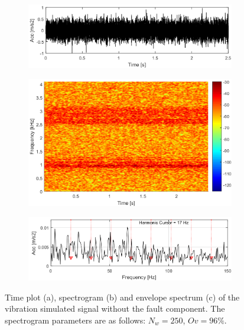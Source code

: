 \begin{figure}[!ht]
    \centering
    \begin{subfigure}[b]{0.8\textwidth}
        \centering
        \captionsetup{skip=0.01pt}
         \caption{}
        \includegraphics[width=\textwidth]{wykresy/chapter_application/semi_blind/sygnal_bez_impulsow.png}
        \label{fig:chapter7/semi_blind/time_zdrowy}
    \end{subfigure}
    \begin{subfigure}[b]{0.7\textwidth}
        \centering
        \captionsetup{skip=0.01pt}
         \caption{}
        \includegraphics[width=\textwidth]{wykresy/chapter_application/semi_blind/spectrogramsygnal_bez_impulsow.png}
        \label{fig:chapter7/semi_blind/spectrogram_zdrowy}
    \end{subfigure}
    \begin{subfigure}[b]{0.8\textwidth}
        \centering
        \captionsetup{skip=0.01pt}
        \caption{}
        \includegraphics[width=\textwidth]{wykresy/chapter_application/semi_blind/widmo_obwiedni_sygnal_bez_impulsow.png}
        \label{fig:chapter7/semi_blind/obwiednia_zdrowy}
    \end{subfigure}
    \caption{Time plot (a), spectrogram (b) and envelope spectrum (c) of the vibration simulated signal without the fault component. The spectrogram parameters are as follows: $N_w=250$, $Ov=96\%$.}
    \end{figure}
